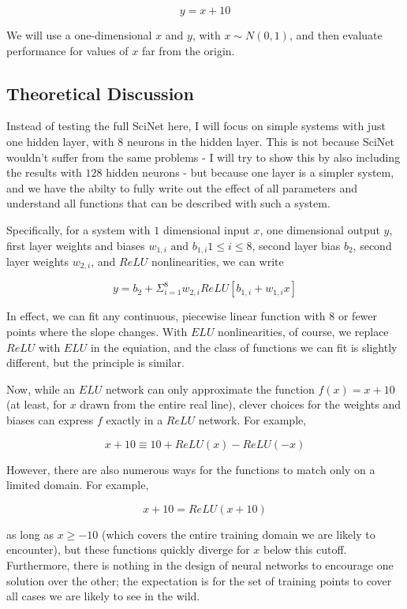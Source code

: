 \documentclass[aps,prl,preprint,groupedaddress]{revtex4-1}
\begin{document}
$$ y = x + 10 $$

We will use a one-dimensional $x$ and $y$, with $x \sim N(0, 1)$, and then evaluate performance for values of $x$ far from the origin.

\subsection{Theoretical Discussion}

Instead of testing the full SciNet here, I will focus on simple systems with just one hidden layer, with $8$ neurons in the hidden layer. This is not because SciNet wouldn't suffer from the same problems - I will try to show this by also including the results with $128$ hidden neurons - but because one layer is a simpler system, and we have the abilty to fully write out the effect of all parameters and understand all functions that can be described with such a system.

Specifically, for a system with $1$ dimensional input $x$, one dimensional output $y$, first layer weights and biases $w_{1, i} \text{ and } b_{1, i} 1 \le i \le 8$, second layer bias $b_2$, second layer weights $w_{2, i}$, and $ReLU$ nonlinearities, we can write

$$ y = b_2 + \Sigma_{i = 1}^8 w_{2, i} ReLU [ b_{1, i} + w_{1, i} x ]$$

In effect, we can fit any continuous, piecewise linear function with $8$ or fewer points where the slope changes. With $ELU$ nonlinearities, of course, we replace $ReLU$ with $ELU$ in the equiation, and the class of functions we can fit is slightly different, but the principle is similar.

Now, while an $ELU$ network can only approximate the function $f(x) = x + 10$ (at least, for $x$ drawn from the entire real line), clever choices for the weights and biases can express $f$ exactly in a $ReLU$ network. For example,

$$ x + 10 \equiv 10 + ReLU(x) - ReLU(-x) $$

However, there are also numerous ways for the functions to match only on a limited domain. For example, 

$$ x + 10 = ReLU(x + 10) $$

as long as $x \ge -10$ (which covers the entire training domain we are likely to encounter), but these functions quickly diverge for $x$ below this cutoff. 
Furthermore, there is nothing in the design of neural networks to encourage one solution over the other; the expectation is for the set of training points to cover all cases we are likely to see in the wild.
\end{document}

